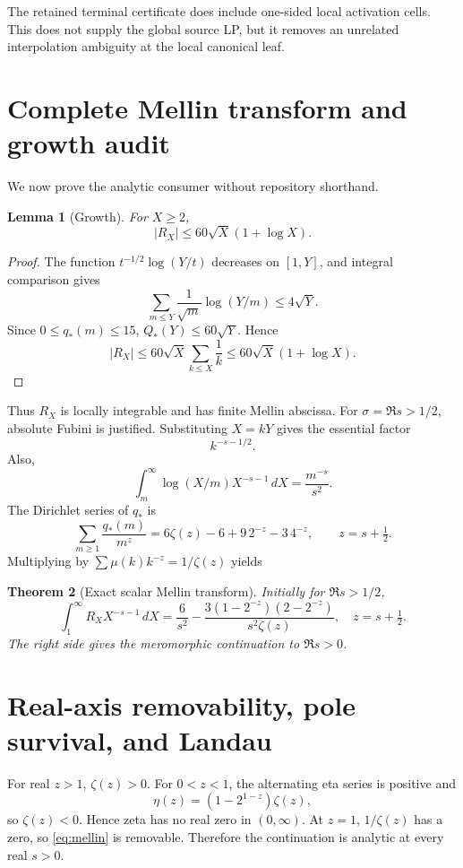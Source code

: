 \documentclass[11pt]{article}
\newtheorem{theorem}{Theorem}[section]
\newtheorem{lemma}[theorem]{Lemma}
\newcommand{\1}{\mathbf 1}
\begin{document}
The retained terminal certificate does include one-sided local activation cells.  This does not supply the global source LP, but it removes an unrelated interpolation ambiguity at the local canonical leaf.

\section{Complete Mellin transform and growth audit}

We now prove the analytic consumer without repository shorthand.

\begin{lemma}[Growth]\label{lem:growth}
For $X\ge2$,
\[
|R_X|\le60\sqrt X(1+\log X).
\]
\end{lemma}
\begin{proof}
The function $t^{-1/2}\log(Y/t)$ decreases on $[1,Y]$, and integral comparison gives
\[
\sum_{m\le Y}\frac1{\sqrt m}\log(Y/m)\le4\sqrt Y.
\]
Since $0\le q_*(m)\le15$, $Q_*(Y)\le60\sqrt Y$.  Hence
\[
|R_X|\le60\sqrt X\sum_{k\le X}\frac1k
\le60\sqrt X(1+\log X).
\]
\end{proof}

Thus $R_X$ is locally integrable and has finite Mellin abscissa.  For $\sigma=\Re s>1/2$, absolute Fubini is justified.  Substituting $X=kY$ gives the essential factor
\[
k^{-s-1/2}.
\]
Also,
\[
\int_m^\infty\log(X/m)X^{-s-1}\,dX=\frac{m^{-s}}{s^2}.
\]
The Dirichlet series of $q_*$ is
\[
\sum_{m\ge1}\frac{q_*(m)}{m^z}
=6\zeta(z)-6+9\,2^{-z}-3\,4^{-z},
\qquad z=s+\tfrac12.
\]
Multiplying by $\sum\mu(k)k^{-z}=1/\zeta(z)$ yields
\begin{theorem}[Exact scalar Mellin transform]\label{thm:mellin}
Initially for $\Re s>1/2$,
\begin{equation}\label{eq:mellin}
\boxed{
\int_1^\infty R_X X^{-s-1}\,dX
=\frac6{s^2}
-\frac{3(1-2^{-z})(2-2^{-z})}{s^2\zeta(z)},
\quad z=s+\tfrac12.}
\end{equation}
The right side gives the meromorphic continuation to $\Re s>0$.
\end{theorem}

\section{Real-axis removability, pole survival, and Landau}

For real $z>1$, $\zeta(z)>0$.  For $0<z<1$, the alternating eta series is positive and
\[
\eta(z)=(1-2^{1-z})\zeta(z),
\]
so $\zeta(z)<0$.  Hence zeta has no real zero in $(0,\infty)$.  At $z=1$, $1/\zeta(z)$ has a zero, so \eqref{eq:mellin} is removable.  Therefore the continuation is analytic at every real $s>0$.
\end{document}
